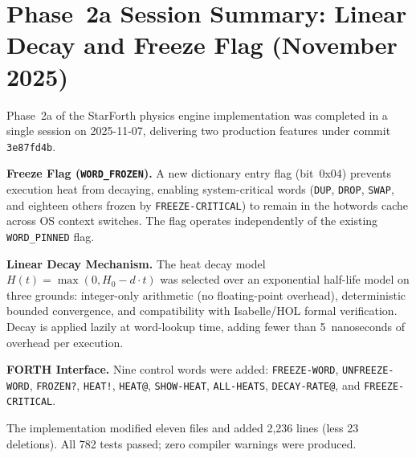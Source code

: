 
\section*{Phase~2a Session Summary: Linear Decay and Freeze Flag (November 2025)}

Phase~2a of the StarForth physics engine implementation was completed in a
single session on 2025-11-07, delivering two production features under commit
\texttt{3e87fd4b}.

\textbf{Freeze Flag (\texttt{WORD\_FROZEN}).}
A new dictionary entry flag (bit~0x04) prevents execution heat from decaying,
enabling system-critical words (\texttt{DUP}, \texttt{DROP}, \texttt{SWAP},
and eighteen others frozen by \texttt{FREEZE-CRITICAL}) to remain in the
hotwords cache across OS context switches. The flag operates independently of
the existing \texttt{WORD\_PINNED} flag.

\textbf{Linear Decay Mechanism.}
The heat decay model $H(t) = \max(0, H_0 - d \cdot t)$ was selected over an
exponential half-life model on three grounds: integer-only arithmetic (no
floating-point overhead), deterministic bounded convergence, and compatibility
with Isabelle/HOL formal verification. Decay is applied lazily at word-lookup
time, adding fewer than 5~nanoseconds of overhead per execution.

\textbf{FORTH Interface.}
Nine control words were added: \texttt{FREEZE-WORD}, \texttt{UNFREEZE-WORD},
\texttt{FROZEN?}, \texttt{HEAT!}, \texttt{HEAT@}, \texttt{SHOW-HEAT},
\texttt{ALL-HEATS}, \texttt{DECAY-RATE@}, and \texttt{FREEZE-CRITICAL}.

The implementation modified eleven files and added 2{,}236 lines (less 23
deletions). All 782 tests passed; zero compiler warnings were produced.

